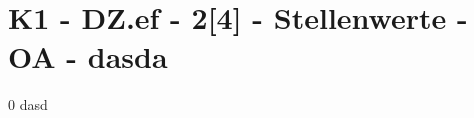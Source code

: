 \section{K1 - DZ.ef - 2[4] - Stellenwerte - OA - dasda}

\begin{langesbeispiel}\item[0] %
dasd

\end{langesbeispiel}
